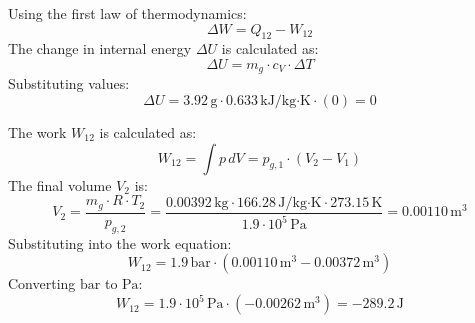Using the first law of thermodynamics:  
\[
\Delta W = Q_{12} - W_{12}
\]  
The change in internal energy \( \Delta U \) is calculated as:  
\[
\Delta U = m_g \cdot c_V \cdot \Delta T
\]  
Substituting values:  
\[
\Delta U = 3.92 \, \text{g} \cdot 0.633 \, \text{kJ/kg·K} \cdot (0) = 0
\]  

The work \( W_{12} \) is calculated as:  
\[
W_{12} = \int p \, dV = p_{g,1} \cdot (V_2 - V_1)
\]  
The final volume \( V_2 \) is:  
\[
V_2 = \frac{m_g \cdot R \cdot T_2}{p_{g,2}} = \frac{0.00392 \, \text{kg} \cdot 166.28 \, \text{J/kg·K} \cdot 273.15 \, \text{K}}{1.9 \cdot 10^5 \, \text{Pa}} = 0.00110 \, \text{m}^3
\]  
Substituting into the work equation:  
\[
W_{12} = 1.9 \, \text{bar} \cdot (0.00110 \, \text{m}^3 - 0.00372 \, \text{m}^3)
\]  
Converting \( \text{bar} \) to \( \text{Pa} \):  
\[
W_{12} = 1.9 \cdot 10^5 \, \text{Pa} \cdot (-0.00262 \, \text{m}^3) = -289.2 \, \text{J}
\]